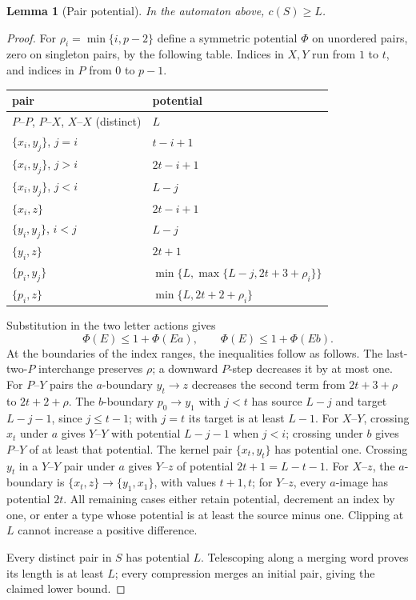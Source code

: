 \documentclass[11pt]{article}
\newtheorem{lemma}[theorem]{Lemma}
\theoremstyle{definition}
\theoremstyle{plain}
\begin{document}
\begin{lemma}[Pair potential]\label{lem:binary-potential}
In the automaton above, $c(S)\ge L$.
\end{lemma}
\begin{proof}
For $\rho_i=\min\{i,p-2\}$ define a symmetric potential $\Phi$ on unordered
pairs, zero on singleton pairs, by the following table. Indices in $X,Y$
run from $1$ to $t$, and indices in $P$ from $0$ to $p-1$.
\begin{center}\small
\begin{tabular}{ll}
pair&potential\\ \hline
$P$--$P$, $P$--$X$, $X$--$X$ (distinct)&$L$\\
$\{x_i,y_j\}$, $j=i$&$t-i+1$\\
$\{x_i,y_j\}$, $j>i$&$2t-i+1$\\
$\{x_i,y_j\}$, $j<i$&$L-j$\\
$\{x_i,z\}$&$2t-i+1$\\
$\{y_i,y_j\}$, $i<j$&$L-j$\\
$\{y_i,z\}$&$2t+1$\\
$\{p_i,y_j\}$&$\min\{L,\max\{L-j,2t+3+\rho_i\}\}$\\
$\{p_i,z\}$&$\min\{L,2t+2+\rho_i\}$
\end{tabular}
\end{center}
Substitution in the two letter actions gives
\[
 \Phi(E)\le1+\Phi(Ea),\qquad \Phi(E)\le1+\Phi(Eb).
\]
At the boundaries of the index ranges, the inequalities follow as follows. The last-two-$P$ interchange preserves $\rho$;
a downward $P$-step decreases it by at most one.
For $P$--$Y$ pairs the $a$-boundary $y_t\to z$ decreases the second term
from $2t+3+\rho$ to $2t+2+\rho$.
The $b$-boundary $p_0\to y_1$ with $j<t$ has source $L-j$
and target $L-j-1$, since $j\le t-1$; with $j=t$ its target is at least $L-1$.
For $X$--$Y$, crossing $x_t$ under $a$ gives $Y$--$Y$ with potential $L-j-1$
when $j<i$; crossing under $b$ gives $P$--$Y$ of at least that potential.
The kernel pair $\{x_t,y_t\}$ has potential one.
Crossing $y_t$ in a $Y$--$Y$ pair under $a$ gives $Y$--$z$ of
potential $2t+1=L-t-1$.
For $X$--$z$, the $a$-boundary is $\{x_t,z\}\to\{y_1,x_1\}$,
with values $t+1,t$; for $Y$--$z$, every $a$-image has potential $2t$.
All remaining cases either retain potential, decrement an index by one,
or enter a type whose potential is at least the source minus one.
Clipping at $L$ cannot increase a positive difference.

Every distinct pair in $S$ has potential $L$.
Telescoping along a merging word proves its length is at least $L$;
every compression merges an initial pair, giving the claimed lower bound.

\end{proof}
\end{document}
